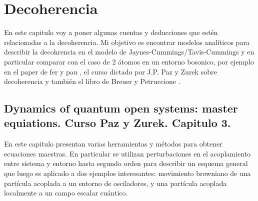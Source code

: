 \chapter{Decoherencia}
\label{ch4_decoherencia}


\pagestyle{fancy}
\fancyhf{}
\fancyhead[LE]{\nouppercase{\rightmark\hfill}}
\fancyhead[RO]{\nouppercase{\leftmark\hfill}}
\fancyfoot[LE,RO]{\hfill\thepage\hfill}

En este capitulo voy a poner algunas cuentas y deducciones que estén relacionadas a la decoherencia. Mi objetivo es encontrar modelos analíticos para describir la decohrencia en el modelo de Jaynes-Cummings/Tavis-Cummings y en particular comparar con el caso de 2 átomos en un entorno bosonico, por ejemplo en el paper de fer y pau \cite{fg1}, el curso dictado por J.P. Paz y Zurek sobre decoherencia \cite{CursoPazZurek1999}  y también el libro de Breuer y Petruccione \cite{Breuer2002}.

\section{Dynamics of quantum open systems: master equiations. Curso Paz y Zurek. Capitulo 3.}

En este capitulo presentan varias herramientas y métodos para obtener ecuaciones maestras. En particular se utilizan perturbaciones en el acoplamiento entre sistema y entorno hasta segundo orden para describir un esquema general que luego es aplicado a dos ejemplos interesantes: movimiento browniano de una partícula acoplada a un entorno de osciladores, y una partícula acoplada localmente a un campo escalar cuántico. 

